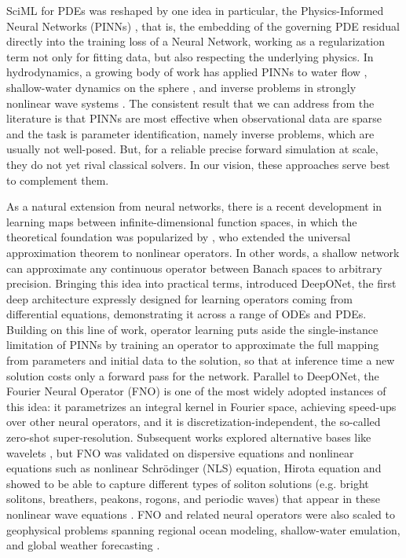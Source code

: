 SciML for PDEs was reshaped by one idea in particular, the Physics-Informed Neural Networks (PINNs) \parencite{raissi2019}, that is, the embedding of the governing PDE residual directly into the training loss of a Neural Network, working as a regularization term not only for fitting data, but also respecting the underlying physics. In hydrodynamics, a growing body of work has applied PINNs to water flow \parencite{depina2023}, shallow-water dynamics on the sphere \parencite{bihlo2022}, and inverse problems in strongly nonlinear wave systems \parencite{jagtap2022}. The consistent result that we can address from the literature \parencite{cuomo2023} is that PINNs are most effective when observational data are sparse and the task is parameter identification, namely inverse problems, which are usually not well-posed. But, for a reliable precise forward simulation at scale, they do not yet rival classical solvers. In our vision, these approaches serve best to complement them.

As a natural extension from neural networks, there is a recent development in learning maps between infinite-dimensional function spaces, in which the theoretical foundation was popularized by \textcite{chen1995}, who extended the universal approximation theorem to nonlinear operators. In other words, a shallow network can approximate any continuous operator between Banach spaces to arbitrary precision. Bringing this idea into practical terms, \textcite{lu2021deeponet} introduced DeepONet, the first deep architecture expressly designed for learning operators coming from differential equations, demonstrating it across a range of ODEs and PDEs. Building on this line of work, operator learning puts aside the single-instance limitation of PINNs by training an operator to approximate the full mapping from parameters and initial data to the solution, so that at inference time a new solution costs only a forward pass for the network. Parallel to DeepONet, the Fourier Neural Operator (FNO) \parencite{li2021} is one of the most widely adopted instances of this idea: it parametrizes an integral kernel in Fourier space, achieving speed-ups over other neural operators, and it is discretization-independent, the so-called zero-shot super-resolution. Subsequent works explored alternative bases like wavelets \parencite{gupta2021}, but FNO was validated on dispersive equations and nonlinear equations such as nonlinear Schrödinger (NLS) equation, Hirota equation and showed to be able to capture different types of soliton solutions (e.g. bright solitons, breathers, peakons, rogons, and periodic waves) that appear in these nonlinear wave equations \parencite{zhong2023, pei2022}. FNO and related neural operators were also scaled to geophysical problems spanning regional ocean modeling, shallow-water emulation, and global weather forecasting \parencite{bonev2023, lkhagvasuren2024, uchida2025, patel2025, yu2025}.

